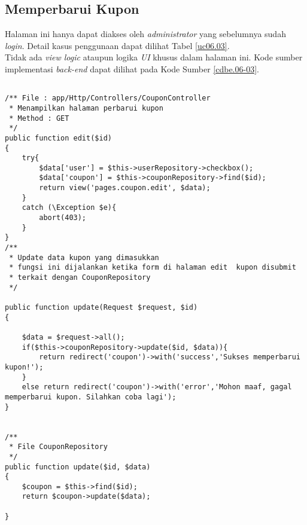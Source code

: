 \subsection{Memperbarui Kupon}
Halaman ini hanya dapat diakses oleh \textit{administrator} yang sebelumnya sudah \textit{login}. Detail kasus penggunaan dapat dilihat Tabel \ref{uc06.03}.\\
\indent Tidak ada \textit{view logic} ataupun logika \textit{UI} khusus dalam halaman ini. Kode sumber implementasi \textit{back-end} dapat dilihat pada Kode Sumber \ref{cdbe.06-03}.

\begin{lstlisting}[label=cdbe.06-03,style=php,caption=Implementasi \textit{Back-end} Kasus Penggunaan Memperbarui kupon]

/** File : app/Http/Controllers/CouponController
 * Menampilkan halaman perbarui kupon
 * Method : GET
 */
public function edit($id)
{
    try{
        $data['user'] = $this->userRepository->checkbox();
        $data['coupon'] = $this->couponRepository->find($id);
        return view('pages.coupon.edit', $data);
    }
    catch (\Exception $e){
        abort(403);
    }
}
/**
 * Update data kupon yang dimasukkan
 * fungsi ini dijalankan ketika form di halaman edit  kupon disubmit
 * terkait dengan CouponRepository
 */

public function update(Request $request, $id)
{

    $data = $request->all();
    if($this->couponRepository->update($id, $data)){
        return redirect('coupon')->with('success','Sukses memperbarui kupon!');
    }
    else return redirect('coupon')->with('error','Mohon maaf, gagal memperbarui kupon. Silahkan coba lagi');
}


/**
 * File CouponRepository
 */
public function update($id, $data)
{
    $coupon = $this->find($id);
    return $coupon->update($data);

}
\end{lstlisting}
	  
      
